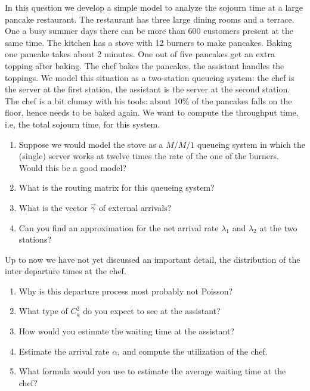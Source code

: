 \begin{question}[use=false]
  In this question we develop a simple model to analyze the sojourn
  time at a large pancake restaurant. The restaurant has three large
  dining rooms and a terrace. One a busy summer days there can be more
  than 600 customers present at the same time. The kitchen has a stove
  with 12 burners to make pancakes. Baking one pancake takes about 2
  minutes. One out of five pancakes get an extra topping after
  baking. The chef bakes the pancakes, the assistant handles the
  toppings. We model this situation as a two-station queueing system:
  the chef is the server at the first station, the assistant is the
  server at the second station. The chef is a bit clumsy with his
  tools: about 10\% of the pancakes falls on the floor, hence needs to
  be baked again.  We want to compute the throughput time, i.e, the
  total sojourn time, for this system.

  \begin{enumerate}
  \item Suppose we would model the stove as a $M/M/1$ queueing system
    in which the (single) server works at twelve times the rate of the
    one of the burners. Would this be a good model? 
  \item What is the routing matrix for this queueing system?
\item What is the vector $\vec \gamma$ of external arrivals?
\item Can you find an approximation for the net arrival rate
  $\lambda_1$ and $\lambda_2$ at the two stations? 
  \end{enumerate}


  Up to now we have not yet discussed an important detail, the
  distribution of the inter departure times at the chef. 

  \begin{enumerate}[resume]
  \item Why is this departure process most probably not Poisson?
  \item What type of $C_a^2$ do you expect to see at the assistant? 
  \item How would you estimate the waiting time at the assistant?
  \item Estimate the arrival rate $\alpha$, and compute the utilization of  the chef.
  \item What formula would you use to estimate the average waiting time at the chef?
  \end{enumerate}


\end{question}
